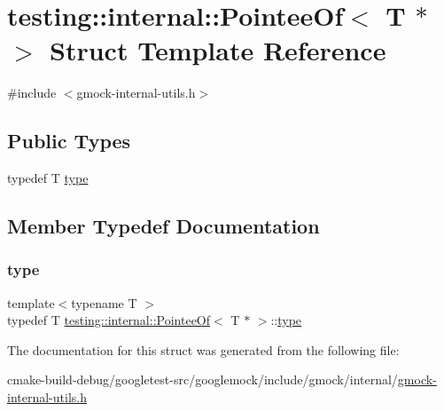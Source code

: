 \hypertarget{structtesting_1_1internal_1_1PointeeOf_3_01T_01_5_01_4}{}\section{testing\+::internal\+::Pointee\+Of$<$ T $\ast$ $>$ Struct Template Reference}
\label{structtesting_1_1internal_1_1PointeeOf_3_01T_01_5_01_4}


{\ttfamily \#include $<$gmock-\/internal-\/utils.\+h$>$}

\subsection*{Public Types}
\begin{DoxyCompactItemize}
\item 
typedef T \mbox{\hyperlink{structtesting_1_1internal_1_1PointeeOf_3_01T_01_5_01_4_a91dde514cd3a8c07cedbe5336c36a55f}{type}}
\end{DoxyCompactItemize}


\subsection{Member Typedef Documentation}
\mbox{\label{structtesting_1_1internal_1_1PointeeOf_3_01T_01_5_01_4_a91dde514cd3a8c07cedbe5336c36a55f}} 
\subsubsection{\texorpdfstring{type}{type}}
{\footnotesize\ttfamily template$<$typename T $>$ \\
typedef T \mbox{\hyperlink{structtesting_1_1internal_1_1PointeeOf}{testing\+::internal\+::\+Pointee\+Of}}$<$ T $\ast$ $>$\+::\mbox{\hyperlink{structtesting_1_1internal_1_1PointeeOf_3_01T_01_5_01_4_a91dde514cd3a8c07cedbe5336c36a55f}{type}}}



The documentation for this struct was generated from the following file\+:\begin{DoxyCompactItemize}
\item 
cmake-\/build-\/debug/googletest-\/src/googlemock/include/gmock/internal/\mbox{\hyperlink{gmock-internal-utils_8h}{gmock-\/internal-\/utils.\+h}}\end{DoxyCompactItemize}
